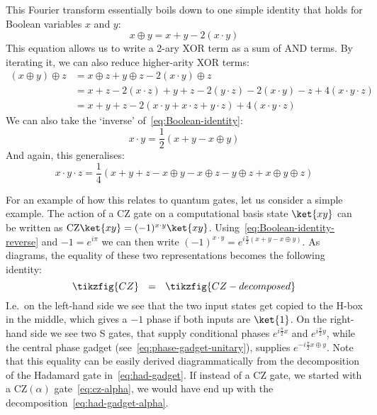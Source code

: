 \documentclass[a4paper,onecolumn,superscriptaddress,11pt,%
				unpublished,%
				allowfontchageintitle,%
				]{quantumarticle}
\begin{document}
This Fourier transform essentially boils down to one simple identity that holds for Boolean variables $x$ and $y$:
\begin{equation}\label{eq:Boolean-identity}
	x\oplus y = x + y - 2(x\cdot y)
\end{equation}
This equation allows us to write a 2-ary XOR term as a sum of AND terms. By iterating it, we can also reduce higher-arity XOR terms:
\begin{align*}
	(x\oplus y)\oplus z &= x\oplus z + y\oplus z - 2(x\cdot y)\oplus z
	\\
	&= x + z - 2(x\cdot z) + y + z - 2(y\cdot z) - 2(x\cdot y) - z + 4(x\cdot y\cdot z) \\
	&= x + y + z - 2(x\cdot y + x\cdot z + y\cdot z) + 4(x\cdot y\cdot z)
\end{align*}
We can also take the `inverse' of~\eqref{eq:Boolean-identity}:
\begin{equation}\label{eq:Boolean-identity-reverse}
	x\cdot y = \frac12 (x+y - x\oplus y)
\end{equation}
And again, this generalises:
\begin{equation}\label{eq:mult-xor-3}
	x\cdot y \cdot z = \frac14 (x + y + z -x\oplus y - x\oplus z - y\oplus z + x\oplus y \oplus z)
\end{equation}

For an example of how this relates to quantum gates, let us consider a simple example. The action of a CZ gate on a computational basis state $\ket{xy}$ can be written as $\text{CZ}\ket{xy} = (-1)^{x\cdot y}\ket{xy}$.
Using~\eqref{eq:Boolean-identity-reverse} and $-1 = e^{i\pi}$ we can then write $(-1)^{x\cdot y} = e^{i\frac\pi2 (x+y-x\oplus y)}$.
As diagrams, the equality of these two representations becomes the following identity:
\begin{equation}
	\tikzfig{CZ} \ \ = \ \ \tikzfig{CZ-decomposed}
\end{equation}
I.e.~on the left-hand side we see that the two input states get copied to the H-box in the middle, which gives a $-1$ phase if both inputs are $\ket{1}$. On the right-hand side we see two S gates, that supply conditional phases $e^{i\frac\pi2 x}$ and $e^{i\frac\pi2 y}$, while the central phase gadget (see~\eqref{eq:phase-gadget-unitary}), supplies $e^{-i\frac\pi2 x\oplus y}$.
Note that this equality can be easily derived diagrammatically from the decomposition of the Hadamard gate in~\eqref{eq:had-gadget}.
If instead of a CZ gate, we started with a CZ$(\alpha)$ gate~\eqref{eq:cz-alpha}, we would have end up with the decomposition~\eqref{eq:had-gadget-alpha}.
\end{document}
